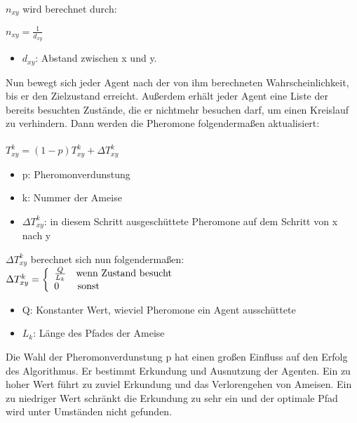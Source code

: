 $n_{xy}$ wird berechnet durch:\\ 
\begin{large}
  $n_{xy}=\frac{1}{d_{xy}}$
\end{large}

\begin{itemize}
  \item $d_{xy}$: Abstand zwischen x und y.
\end{itemize}

Nun bewegt sich jeder Agent nach der von ihm berechneten Wahrscheinlichkeit, bis er den Zielzustand erreicht. Außerdem erhält jeder Agent eine Liste der bereits besuchten Zustände, die er nichtmehr besuchen darf, um einen Kreislauf zu verhindern. Dann werden die Pheromone folgendermaßen aktualisiert:\\\\\large
$T_{xy}^k=(1-p)T_{xy}^k+\Delta T_{xy}^k$\normalsize
\begin{itemize}
  \item p: Pheromonverdunstung
  \item k: Nummer der Ameise
  \item $\Delta T_{xy}^k$: in diesem Schritt ausgeschüttete Pheromone auf dem Schritt von x nach y
\end{itemize}
$\Delta T_{xy}^k$ berechnet sich nun folgendermaßen:\\
\large
$\Delta T_{xy}^k = \left\{
\begin{array}{ll}
\frac{Q}{L_k} & \normalsize \textrm{wenn Zustand besucht} \\
0 & \, \normalsize\textrm{sonst} \\
\end{array}
\right. $
\normalsize
\begin{itemize}
    \item Q: Konstanter Wert, wieviel Pheromone ein Agent ausschüttete
    \item $L_k$: Länge des Pfades der Ameise
\end{itemize}

Die Wahl der Pheromonverdunstung p hat einen großen Einfluss auf den Erfolg des Algorithmus. Er bestimmt Erkundung und Ausnutzung der Agenten. Ein zu hoher Wert führt zu zuviel Erkundung und das Verlorengehen von Ameisen. Ein zu niedriger Wert schränkt die Erkundung zu sehr ein und der optimale Pfad wird unter Umständen nicht gefunden.\\
